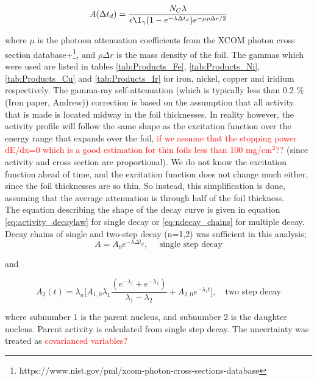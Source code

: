 \documentclass[a4paper,11pt,twoside]{book}
\begin{document}
\begin{equation}
    A(\Delta t_d) = \frac{N_C\lambda}{\epsilon\I_\gamma (1-e^{-\lambda \Delta t_d})e^{-\mu\rho\Delta r/2}}
\end{equation}

where $\mu$ is the photoon attenuation coefficients from the XCOM photon cross section database+\footnote{https://www.nist.gov/pml/xcom-photon-cross-sections-database}, and $\rho\Delta r$ is the mass density of the foil. The gammas which were used are listed in tables \ref{tab:Products_Fe}, \ref{tab:Products_Ni}, \ref{tab:Products_Cu} and \ref{tab:Products_Ir} for iron, nickel, copper and iridium respectively. The gamma-ray self-attenuation (which is typically less than 0.2 \% (Iron paper, Andrew)) correction is based on the assumption that all activity that is made is located midway in the foil thicknesses. In reality however, the activity profile will follow the same shape as the excitation function over the energy range that expands over the foil, \textcolor{red}{if we assume that the stopping power dE/dx=0 which is a good estimation for thin foils less than 100 mg/cm$^2$??} (since activity and cross section are proportional). We do not know the excitation function ahead of time, and the excitation function does not change much either, since the foil thicknesses are so thin. So instead, this simplification is done, assuming that the average attenuation is through half of the foil thickness. \\ 

\noindent 
The equation describing the shape of the decay curve is given in equation \ref{eq:activity_decaylaw} for single decay or \ref{eq:ndecay_chains} for multiple decay. Decay chains of single and two-step decay (n=1,2) was sufficient in this analysis; 
\begin{equation} \label{eq:onestep_activity}
    A = A_0 e^{-\lambda \Delta t_d},\quad \text{ single step decay}
\end{equation}

and

\begin{equation} \label{eq:twostep_activity}
    A_2(t) = \lambda_n \Big[ A_{1,0}\lambda_1 \frac{(e^{-\lambda_1 } + e^{-\lambda_2})}{\lambda_1 - \lambda _2} + A_{2,0}e^{-\lambda_2 t} \Big],\quad \text{two step decay}
\end{equation}

where subnumber 1 is the parent nucleus, and subnumber 2 is the daughter nucleus. Parent activity is calculated from single step decay. The uncertainty was treated as \textcolor{red}{covarianced variables?} \\
\end{document}
